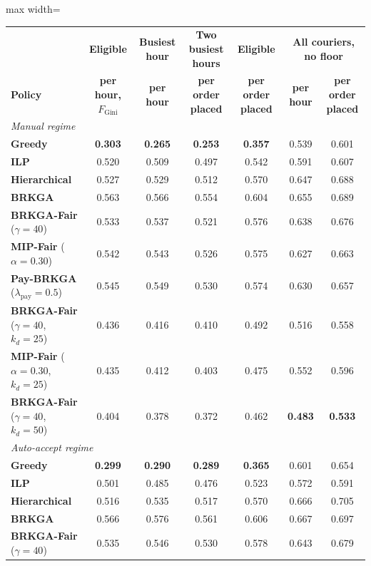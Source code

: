 \documentclass[a4paper,11pt,review,3p,authoryear]{elsarticle}
\newcommand{\FG}{F_{\text{Gini}}}
\begin{document}
\begin{table}[htbp]
\centering
\small
\begin{adjustbox}{max width=\textwidth}
\begin{tabular}{l|c|cc|c|cc}
\hline
 & \textbf{Eligible} & \textbf{Busiest hour} & \textbf{Two busiest hours} & \textbf{Eligible} & \multicolumn{2}{c}{\textbf{All couriers, no floor}} \\
\textbf{Policy} & \textbf{per hour, $\FG$} & \textbf{per hour} & \textbf{per order placed} & \textbf{per order placed} & \textbf{per hour} & \textbf{per order placed} \\
\hline
\multicolumn{7}{l}{\textit{Manual regime}} \\
\textbf{Greedy} & \textbf{0.303} & \textbf{0.265} & \textbf{0.253} & \textbf{0.357} & 0.539 & 0.601 \\
\textbf{ILP} & 0.520 & 0.509 & 0.497 & 0.542 & 0.591 & 0.607 \\
\textbf{Hierarchical} & 0.527 & 0.529 & 0.512 & 0.570 & 0.647 & 0.688 \\
\textbf{BRKGA} & 0.563 & 0.566 & 0.554 & 0.604 & 0.655 & 0.689 \\
\textbf{BRKGA-Fair} ($\gamma = 40$) & 0.533 & 0.537 & 0.521 & 0.576 & 0.638 & 0.676 \\
\textbf{MIP-Fair} ($\alpha = 0.30$) & 0.542 & 0.543 & 0.526 & 0.575 & 0.627 & 0.663 \\
\textbf{Pay-BRKGA} ($\lambda_{\text{pay}} = 0.5$) & 0.545 & 0.549 & 0.530 & 0.574 & 0.630 & 0.657 \\
\textbf{BRKGA-Fair} ($\gamma = 40$, $k_d = 25$) & 0.436 & 0.416 & 0.410 & 0.492 & 0.516 & 0.558 \\
\textbf{MIP-Fair} ($\alpha = 0.30$, $k_d = 25$) & 0.435 & 0.412 & 0.403 & 0.475 & 0.552 & 0.596 \\
\textbf{BRKGA-Fair} ($\gamma = 40$, $k_d = 50$) & 0.404 & 0.378 & 0.372 & 0.462 & \textbf{0.483} & \textbf{0.533} \\
\hline
\multicolumn{7}{l}{\textit{Auto-accept regime}} \\
\textbf{Greedy} & \textbf{0.299} & \textbf{0.290} & \textbf{0.289} & \textbf{0.365} & 0.601 & 0.654 \\
\textbf{ILP} & 0.501 & 0.485 & 0.476 & 0.523 & 0.572 & 0.591 \\
\textbf{Hierarchical} & 0.516 & 0.535 & 0.517 & 0.570 & 0.666 & 0.705 \\
\textbf{BRKGA} & 0.566 & 0.576 & 0.561 & 0.606 & 0.667 & 0.697 \\
\textbf{BRKGA-Fair} ($\gamma = 40$) & 0.535 & 0.546 & 0.530 & 0.578 & 0.643 & 0.679 \\

\end{tabular}
\end{adjustbox}
\end{table}
\end{document}
